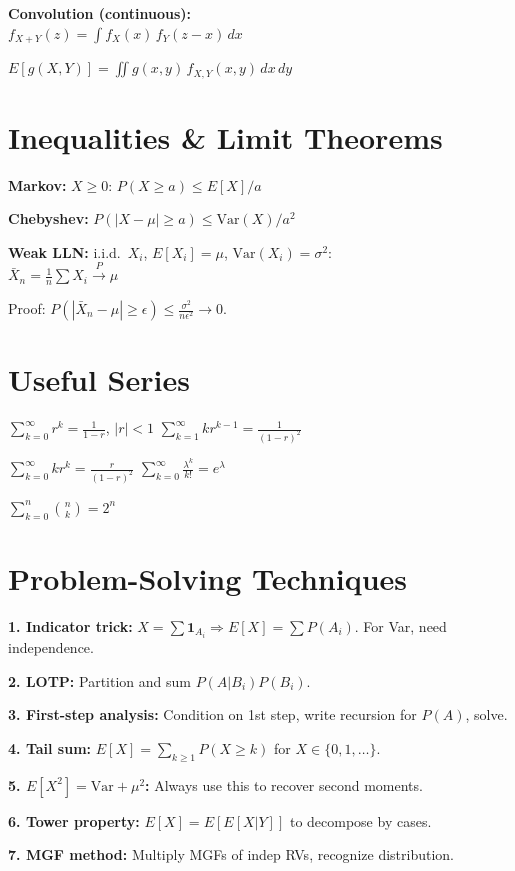 \documentclass[6pt]{article}
\newcommand{\hi}[1]{\colorbox{yellow!25}{\ensuremath{#1}}}
\begin{document}
\begin{multicols}{4}
\textbf{Convolution (continuous):}\\
$f_{X+Y}(z)=\int f_X(x)\,f_Y(z-x)\,dx$

$E[g(X,Y)]=\iint g(x,y)\,f_{X,Y}(x,y)\,dx\,dy$

\section{Inequalities \& Limit Theorems}

\textbf{Markov:} $X\geq 0$: $P(X\geq a)\leq E[X]/a$

\textbf{Chebyshev:} \hi{P(|X-\mu|\geq a)\leq \text{Var}(X)/a^2}

\textbf{Weak LLN:} i.i.d.\ $X_i$, $E[X_i]=\mu$, $\text{Var}(X_i)=\sigma^2$:\\
$\bar{X}_n=\frac{1}{n}\sum X_i \xrightarrow{P} \mu$

Proof: $P(|\bar{X}_n-\mu|\geq\epsilon)\leq \frac{\sigma^2}{n\epsilon^2}\to 0$.

\section{Useful Series}

\hi{\sum_{k=0}^{\infty}r^k=\frac{1}{1-r}}, $|r|<1$\quad
\hi{\sum_{k=1}^{\infty}kr^{k-1}=\frac{1}{(1-r)^2}}

$\sum_{k=0}^{\infty}kr^k=\frac{r}{(1-r)^2}$\quad
$\sum_{k=0}^{\infty}\frac{\lambda^k}{k!}=e^{\lambda}$

$\sum_{k=0}^n\binom{n}{k}=2^n$

\section{Problem-Solving Techniques}

\textbf{1. Indicator trick:} $X=\sum\mathbf{1}_{A_i} \Rightarrow E[X]=\sum P(A_i)$. For Var, need independence.

\textbf{2. LOTP:} Partition and sum $P(A|B_i)P(B_i)$.

\textbf{3. First-step analysis:} Condition on 1st step, write recursion for $P(A)$, solve.

\textbf{4. Tail sum:} $E[X]=\sum_{k\geq 1}P(X\geq k)$ for $X\in\{0,1,\ldots\}$.

\textbf{5. $E[X^2]=\text{Var}+\mu^2$:} Always use this to recover second moments.

\textbf{6. Tower property:} $E[X]=E[E[X|Y]]$ to decompose by cases.

\textbf{7. MGF method:} Multiply MGFs of indep RVs, recognize distribution.


\end{multicols}
\end{document}
